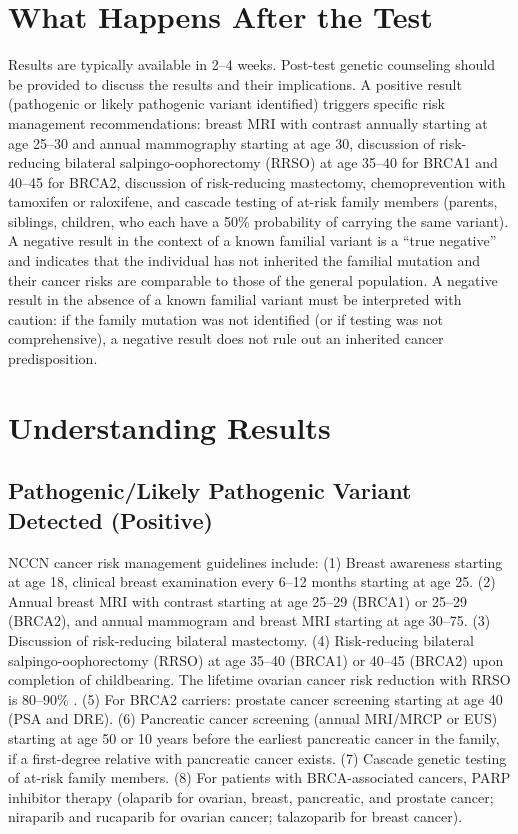 \section*{What Happens After the Test}
Results are typically available in 2--4 weeks. Post-test genetic counseling should be provided to discuss the results and their implications. A positive result (pathogenic or likely pathogenic variant identified) triggers specific risk management recommendations: breast MRI with contrast annually starting at age 25--30 and annual mammography starting at age 30, discussion of risk-reducing bilateral salpingo-oophorectomy (RRSO) at age 35--40 for BRCA1 and 40--45 for BRCA2, discussion of risk-reducing mastectomy, chemoprevention with tamoxifen or raloxifene, and cascade testing of at-risk family members (parents, siblings, children, who each have a 50\% probability of carrying the same variant). A negative result in the context of a known familial variant is a ``true negative'' and indicates that the individual has not inherited the familial mutation and their cancer risks are comparable to those of the general population. A negative result in the absence of a known familial variant must be interpreted with caution: if the family mutation was not identified (or if testing was not comprehensive), a negative result does not rule out an inherited cancer predisposition.

\section*{Understanding Results}

\subsection*{Pathogenic/Likely Pathogenic Variant Detected (Positive)}
NCCN cancer risk management guidelines include: (1) Breast awareness starting at age 18, clinical breast examination every 6--12 months starting at age 25. (2) Annual breast MRI with contrast starting at age 25--29 (BRCA1) or 25--29 (BRCA2), and annual mammogram and breast MRI starting at age 30--75. (3) Discussion of risk-reducing bilateral mastectomy. (4) Risk-reducing bilateral salpingo-oophorectomy (RRSO) at age 35--40 (BRCA1) or 40--45 (BRCA2) upon completion of childbearing. The lifetime ovarian cancer risk reduction with RRSO is 80--90\% \cite{domchek2010association}. (5) For BRCA2 carriers: prostate cancer screening starting at age 40 (PSA and DRE). (6) Pancreatic cancer screening (annual MRI/MRCP or EUS) starting at age 50 or 10 years before the earliest pancreatic cancer in the family, if a first-degree relative with pancreatic cancer exists. (7) Cascade genetic testing of at-risk family members. (8) For patients with BRCA-associated cancers, PARP inhibitor therapy (olaparib for ovarian, breast, pancreatic, and prostate cancer; niraparib and rucaparib for ovarian cancer; talazoparib for breast cancer).

